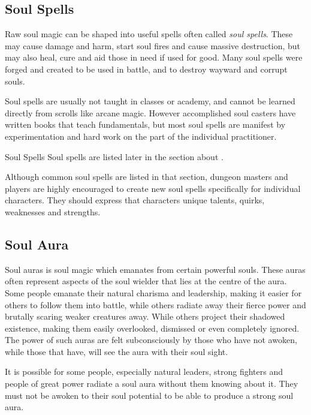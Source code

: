 \subsection{Soul Spells}
\label{sec:Soul Spells}

Raw soul magic can be shaped into useful spells often called \emph{soul spells}.
These may cause damage and harm, start soul fires and cause massive destruction,
but may also heal, cure and aid those in need if used for good. Many soul spells
were forged and created to be used in battle, and to destroy wayward and corrupt
souls.

Soul spells are usually not taught in classes or academy, and cannot be learned
directly from scrolls like arcane magic. However accomplished soul casters have
written books that teach fundamentals, but most soul spells are manifest by
experimentation and hard work on the part of the individual practitioner.

\begin{35e}{Soul Spells}
  Soul spells are listed later in the section about .

  Although common soul spells are listed in that section, dungeon masters and
  players are highly encouraged to create new soul spells specifically for
  individual characters. They should express that characters unique talents,
  quirks, weaknesses and strengths.
\end{35e}

\subsection{Soul Aura}
\label{sec:Soul Aura}

Soul auras is soul magic which emanates from certain powerful souls. These
auras often represent aspects of the soul wielder that lies at the centre of
the aura.  Some people emanate their natural charisma and leadership, making
it easier for others to follow them into battle, while others radiate away
their fierce power and brutally scaring weaker creatures away. While others
project their shadowed existence, making them easily overlooked, dismissed or
even completely ignored. The power of such auras are felt subconsciously by
those who have not awoken, while those that have, will see the aura with their
soul sight.

It is possible for some people, especially natural leaders, strong fighters
and people of great power radiate a soul aura without them knowing about it.
They must not be awoken to their soul potential to be able to produce a strong
soul aura.

